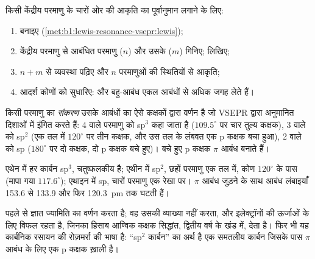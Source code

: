 \begin{method}[आकृति का पूर्वानुमान]\label{met:b1:lewis-resonance-vsepr:vsepr}
किसी केंद्रीय परमाणु के चारों ओर की आकृति का पूर्वानुमान लगाने के लिए:
\begin{enumerate}
  \item {} बनाइए (\cref{met:b1:lewis-resonance-vsepr:lewis});
  \item केंद्रीय परमाणु से आबंधित परमाणु ($n$) और उसके  ($m$) गिनिए;  लिखिए;
  \item $n + m$ से व्यवस्था पढ़िए और $n$ परमाणुओं की
        स्थितियों से आकृति;
  \item आदर्श कोणों को सुधारिए:  और बहु-आबंध एकल आबंधों से अधिक
        जगह लेते हैं।
\end{enumerate}
\end{method}

\begin{definition}[संकरण]\label{def:b1:lewis-resonance-vsepr:hybridisation}
किसी परमाणु का \emph{संकरण} उसके आबंधों का ऐसे कक्षकों
द्वारा वर्णन है जो VSEPR द्वारा अनुमानित दिशाओं में इंगित करते हैं:
 4 वाले परमाणु को sp$^3$ कहा जाता है
($109.5^\circ$ पर चार तुल्य कक्षक),  3 वाले को sp$^2$
(एक तल में $120^\circ$ पर तीन कक्षक, और उस तल के लंबवत एक p कक्षक
बचा हुआ),  2 वाले को sp ($180^\circ$ पर दो कक्षक,
दो p कक्षक बचे हुए)। बचे हुए p कक्षक $\pi$ आबंध बनाते हैं।
\end{definition}

\begin{example}[कार्बनिक रसायन के कार्बन]\label{ex:b1:lewis-resonance-vsepr:carbon}
एथेन में हर कार्बन sp$^3$, चतुष्फलकीय है; एथीन में sp$^2$, छहों
परमाणु एक तल में, कोण $120^\circ$ के पास (मापा गया 
$117.6^\circ$); एथाइन में sp, चारों परमाणु एक रेखा पर। $\pi$ आबंध जुड़ने के साथ आबंध
लंबाइयाँ 153.6 से 133.9 और फिर \qty{120.3}{pm} तक घटती हैं।
\end{example}

\begin{remark}[एक वर्णन, कारण नहीं]\label{rem:b1:lewis-resonance-vsepr:hybrid-limit}
 पहले से ज्ञात ज्यामिति का वर्णन करता है; वह उसकी व्याख्या नहीं
करता, और इलेक्ट्रॉनों की ऊर्जाओं के लिए विफल रहता है, जिनका हिसाब आण्विक कक्षक
सिद्धांत, द्वितीय वर्ष के खंड में, देता है। फिर भी यह कार्बनिक रसायन की
रोज़मर्रा की भाषा है: ``sp$^2$ कार्बन'' का अर्थ है एक समतलीय
कार्बन जिसके पास $\pi$ आबंध के लिए एक p कक्षक ख़ाली है।
\end{remark}

